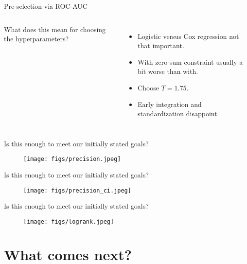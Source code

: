 \documentclass[10pt, aspectratio=169]{beamer}
\begin{document}
\begin{frame}{Pre-selection via ROC-AUC}
  \begin{columns}
    {
      \small
      
    }
      What does this mean for choosing the hyperparameters?
      \begin{itemize}
        \item Logistic versus Cox regression not that important.
        \item With zero-sum constraint usually a bit worse than with.
        \item Choose $T = 1.75$.
        \item Early integration and standardization disappoint.
      \end{itemize}
  \end{columns}
\end{frame}

\begin{frame}{Is this enough to meet our initially stated goals?}
  \begin{figure}[h]
    \centering
    \texttt{[image: figs/precision.jpeg]}
  \end{figure}
\end{frame}

\begin{frame}{Is this enough to meet our initially stated goals?}
  \begin{figure}[h]
    \centering
    \texttt{[image: figs/precision\_ci.jpeg]}
  \end{figure}
\end{frame}

\begin{frame}{Is this enough to meet our initially stated goals?}
  \begin{figure}[h]
    \centering
    \texttt{[image: figs/logrank.jpeg]}
  \end{figure}
\end{frame}

\section{What comes next?}
\end{document}
